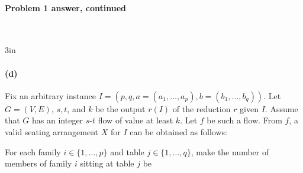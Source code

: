 
\newpage

\paragraph{Problem 1 answer, continued}~

\noindent\begin{answerBox}{3in}   %
  
  \paragraph{(d)}


  Fix an arbitrary  instance $I=(p, q, a=(a_1, \ldots, a_p), b=(b_1,\ldots, b_q))$.
  Let $G=(V,E)$, $s, t$, and $k$ be the output $r(I)$ of the reduction $r$ given $I$.
  Assume that $G$ has an integer $s$-$t$ flow of value at least $k$.
  Let $f$ be such a flow.
  From $f$, a valid seating arrangement $X$ for $I$ can be obtained as follows:

  \bigskip 

  For each family $i\in\{1,\ldots,p\}$ and table $j\in\{1,\ldots,q\}$,
  make the number of members of family $i$ sitting at table $j$ be

\end{answerBox}


